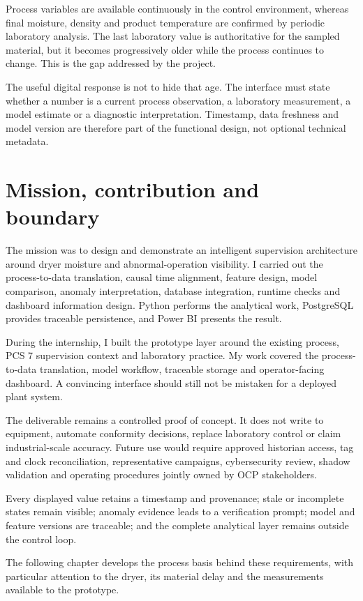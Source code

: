 Process variables are available continuously in the control environment, whereas final moisture, density and product temperature are confirmed by periodic laboratory analysis. The last laboratory value is authoritative for the sampled material, but it becomes progressively older while the process continues to change. This is the gap addressed by the project.

The useful digital response is not to hide that age. The interface must state whether a number is a current process observation, a laboratory measurement, a model estimate or a diagnostic interpretation. Timestamp, data freshness and model version are therefore part of the functional design, not optional technical metadata.

\section{Mission, contribution and boundary}

The mission was to design and demonstrate an intelligent supervision architecture around dryer moisture and abnormal-operation visibility. I carried out the process-to-data translation, causal time alignment, feature design, model comparison, anomaly interpretation, database integration, runtime checks and dashboard information design. Python performs the analytical work, PostgreSQL provides traceable persistence, and Power BI presents the result.

During the internship, I built the prototype layer around the existing process, PCS 7 supervision context and laboratory practice. My work covered the process-to-data translation, model workflow, traceable storage and operator-facing dashboard. A convincing interface should still not be mistaken for a deployed plant system.

The deliverable remains a controlled proof of concept. It does not write to equipment, automate conformity decisions, replace laboratory control or claim industrial-scale accuracy. Future use would require approved historian access, tag and clock reconciliation, representative campaigns, cybersecurity review, shadow validation and operating procedures jointly owned by OCP stakeholders.

\begin{engineeringbox}
Every displayed value retains a timestamp and provenance; stale or incomplete states remain visible; anomaly evidence leads to a verification prompt; model and feature versions are traceable; and the complete analytical layer remains outside the control loop.
\end{engineeringbox}

The following chapter develops the process basis behind these requirements, with particular attention to the dryer, its material delay and the measurements available to the prototype.
